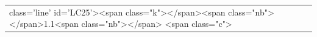 \documentclass[a4paper,11pt,french]{article}
\renewcommand\headrulewidth{0.4pt} %
\renewcommand\footrulewidth{0.4pt} %
\newcommand{\hmwkTitle}{Transchiffrement} %
\newcommand{\hmwkClass}{Master 2 SSI } %
\newcommand{\hmwkAuthorName}{Julien Bourdon} %
\newcommand{\hmwkSubject}{Conduite de projet} %
\newcommand{\hmwkDocName}{Spécification Technique du Besoin} %
\begin{document}
\begin{tabular}{|m{8cm}|m{8cm}|}
class='line' id='LC25'><span class="k">\linespread</span><span class="nb">{</span>1.1<span class="nb">}</span> <span class="c">%
\end{tabular}
\end{document}
